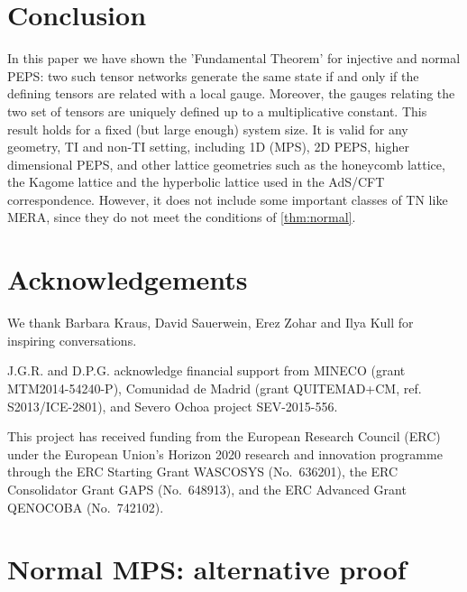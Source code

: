 \documentclass[preprint, superscriptaddress,a4paper,longbibliography]{revtex4-1}
\theoremstyle{definition}
\begin{document}
\section{Conclusion}

In this paper we have shown the 'Fundamental Theorem' for injective and normal PEPS: two such tensor networks generate the same state if and only if the defining tensors are related with a local gauge. Moreover, the gauges relating the two set of tensors are uniquely defined up to a multiplicative constant. This result holds for a fixed (but large enough) system size. It is valid for any geometry, TI and non-TI setting, including 1D (MPS), 2D PEPS, higher dimensional PEPS, and other lattice geometries such as the honeycomb lattice, the Kagome lattice and the hyperbolic lattice used in the AdS/CFT correspondence. However, it does not include some important classes of TN like MERA, since they do not meet the conditions of \cref{thm:normal}.

\section{Acknowledgements}

We thank Barbara Kraus, David Sauerwein, Erez Zohar and Ilya Kull for inspiring conversations.

J.G.R. and  D.P.G. acknowledge financial support from MINECO (grant MTM2014-54240-P), Comunidad de Madrid (grant QUITEMAD+CM, ref. S2013/ICE-2801), and Severo Ochoa project SEV-2015-556.

This project has received funding from the European Research Council (ERC) under
the European Union's Horizon 2020 research and innovation programme
through the ERC Starting Grant WASCOSYS (No.\ 636201), the ERC Consolidator Grant GAPS (No.\ 648913), and the ERC Advanced Grant QENOCOBA (No.\ 742102).
\appendix




\section{Normal MPS: alternative proof} \label{sec:normal_alt}
\end{document}
